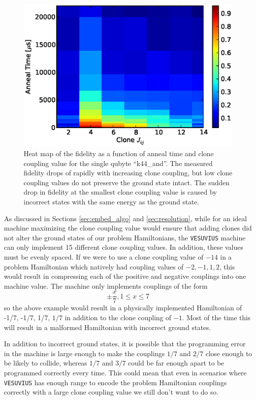 \begin{figure}
	\includegraphics{img/n_8_t_v_c.eps}
	\caption[Variable Clone Coupling Fidelity]{Heat map of the fidelity as a function of anneal time and clone coupling value for the single qubyte ``k44\_and''.  The measured fidelity drops of rapidly with increasing clone coupling, but low clone coupling values do not preserve the ground state intact.  The sudden drop in fidelity at the smallest clone coupling value is caused by incorrect states with the same energy as the ground state.}
	\label{fig:clone_coupling}
\end{figure}

As discussed in Sections \ref{sec:embed_algo} and \ref{sec:resolution}, while for an ideal machine maximizing the clone coupling value would ensure that adding clones did not alter the ground states of our problem Hamiltonians, the \texttt{VESUVIUS} machine can only implement 15 different clone coupling values.  In addition, these values must be evenly spaced.  If we were to use a clone coupling value of $-14$ in a problem Hamiltonian which natively had coupling values of $-2,-1,1,2$, this would result in compressing each of the positive and negative couplings into one machine value.  The machine only implements couplings of the form 
\begin{equation}
	\pm\frac{x}{7}, 1 \le x \le 7
\end{equation}
so the above example would result in a physically implemented Hamiltonian of -1/7, -1/7, 1/7, $1/7$ in addition to the clone coupling of $-1$.  Most of the time this will result in a malformed Hamiltonian with incorrect ground states.

In addition to incorrect ground states, it is possible that the programming error in the machine is large enough to make the couplings $1/7$ and $2/7$ close enough to be likely to collide, whereas $1/7$ and $3/7$ could be far enough apart to be programmed correctly every time.  This could mean that even in scenarios where \texttt{VESUVIUS} has enough range to encode the problem Hamiltonian couplings correctly with a large clone coupling value we still don't want to do so.

